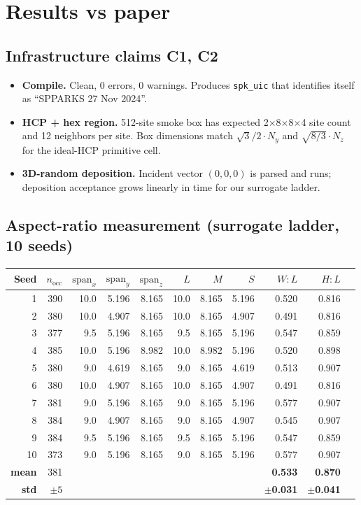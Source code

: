 \documentclass[11pt]{article}
\begin{document}
\section{Results vs paper}

\subsection{Infrastructure claims C1, C2}

\begin{itemize}
  \item \textbf{Compile.} Clean, 0 errors, 0 warnings. Produces \verb|spk_uic| that identifies itself as ``SPPARKS 27 Nov 2024''.
  \item \textbf{HCP + hex region.} 512-site smoke box has expected 2$\times$8$\times$8$\times$4 site count and 12 neighbors per site. Box dimensions match $\sqrt{3}/2\cdot N_y$ and $\sqrt{8/3}\cdot N_z$ for the ideal-HCP primitive cell.
  \item \textbf{3D-random deposition.} Incident vector $(0,0,0)$ is parsed and runs; deposition acceptance grows linearly in time for our surrogate ladder.
\end{itemize}

\subsection{Aspect-ratio measurement (surrogate ladder, 10 seeds)}

\begin{longtable}{@{}rrrrrrrrrrr@{}}
\toprule
Seed & $n_\text{occ}$ & $\text{span}_x$ & $\text{span}_y$ & $\text{span}_z$ & $L$ & $M$ & $S$ & $W\!:\!L$ & $H\!:\!L$ \\
\midrule
\endhead
1 & 390 & 10.0 & 5.196 & 8.165 & 10.0 & 8.165 & 5.196 & 0.520 & 0.816 \\
2 & 380 & 10.0 & 4.907 & 8.165 & 10.0 & 8.165 & 4.907 & 0.491 & 0.816 \\
3 & 377 &  9.5 & 5.196 & 8.165 &  9.5 & 8.165 & 5.196 & 0.547 & 0.859 \\
4 & 385 & 10.0 & 5.196 & 8.982 & 10.0 & 8.982 & 5.196 & 0.520 & 0.898 \\
5 & 380 &  9.0 & 4.619 & 8.165 &  9.0 & 8.165 & 4.619 & 0.513 & 0.907 \\
6 & 380 & 10.0 & 4.907 & 8.165 & 10.0 & 8.165 & 4.907 & 0.491 & 0.816 \\
7 & 381 &  9.0 & 5.196 & 8.165 &  9.0 & 8.165 & 5.196 & 0.577 & 0.907 \\
8 & 384 &  9.0 & 4.907 & 8.165 &  9.0 & 8.165 & 4.907 & 0.545 & 0.907 \\
9 & 384 &  9.5 & 5.196 & 8.165 &  9.5 & 8.165 & 5.196 & 0.547 & 0.859 \\
10 & 373 &  9.0 & 5.196 & 8.165 &  9.0 & 8.165 & 5.196 & 0.577 & 0.907 \\
\midrule
\textbf{mean} & 381 & & & & & & & \textbf{0.533} & \textbf{0.870} \\
\textbf{std}  & $\pm 5$ & & & & & & & \textbf{$\pm$0.031} & \textbf{$\pm$0.041} \\
\bottomrule
\end{longtable}
\end{document}
